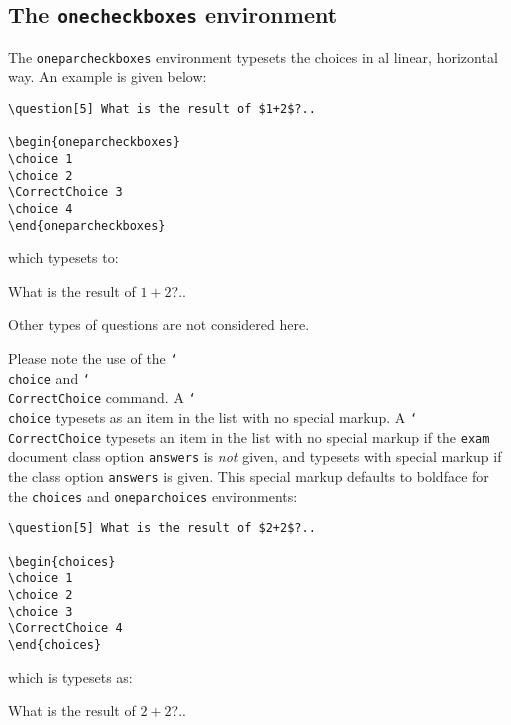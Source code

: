\documentclass[12pt,a4paper]{exam}
\providecommand{\texorpdfstring}[2]{#1}
\newcommand{\bs}{\texorpdfstring{\char`\\}{}}
\begin{document}
\subsection{The \texttt{onecheckboxes} environment}

The \texttt{oneparcheckboxes} environment typesets the choices
in al linear, horizontal way. An example is given below:

\begin{lstlisting}
\question[5] What is the result of $1+2$?..

\begin{oneparcheckboxes}
\choice 1
\choice 2
\CorrectChoice 3
\choice 4
\end{oneparcheckboxes}
\end{lstlisting}

which typesets to:

\begin{questions}
\setcounter{question}{3}
\question[5] What is the result of $1+2$?..

\begin{oneparcheckboxes}
\end{oneparcheckboxes}
\end{questions}

Other types of questions are not considered here.

Please note the use of the \texttt{\bs choice} and \texttt{\bs CorrectChoice}
command. A \texttt{\bs choice} typesets as an item in the list with no special markup.
A \texttt{\bs CorrectChoice} typesets an item in the list with no special markup if
the \texttt{exam} document class option \texttt{answers} is \emph{not} given, and
typesets with special markup if the class option \texttt{answers} is given. This special
markup defaults to boldface for the \texttt{choices} and \texttt{oneparchoices}
environments:

\begin{lstlisting}
\question[5] What is the result of $2+2$?..

\begin{choices}
\choice 1
\choice 2
\choice 3
\CorrectChoice 4
\end{choices}
\end{lstlisting}

which is typesets as:

\printanswers

\begin{questions}
\setcounter{question}{4}
\question[5] What is the result of $2+2$?..

\begin{choices}
\end{choices}
\end{questions}
\end{document}

